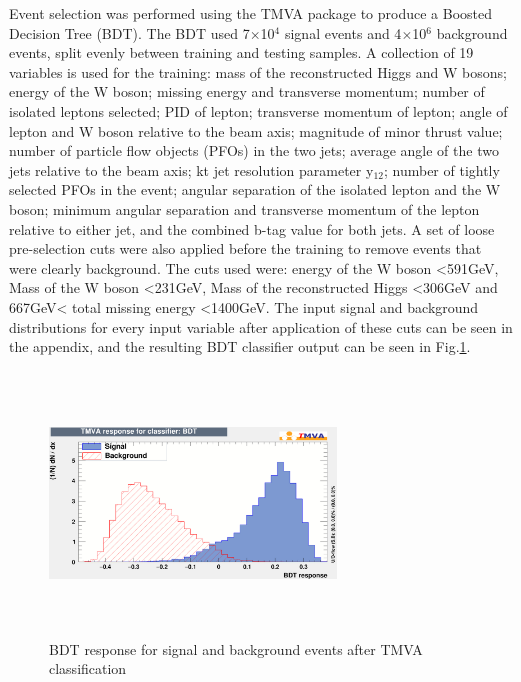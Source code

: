 Event selection was performed using the TMVA package \cite{2007physics...3039H} to produce a Boosted Decision Tree (BDT). The BDT used 7$\times$10$^4$ signal events and 4$\times$10$^6$ background events, split evenly between training and testing samples. A collection of 19 variables is used for the training: mass of the reconstructed Higgs and W bosons; energy of the W boson; missing energy and transverse momentum; number of isolated leptons selected; PID of lepton; transverse momentum of lepton; angle of lepton and W boson relative to the beam axis; magnitude of minor thrust value; number of particle flow objects (PFOs) in the two jets; average angle of the two jets relative to the beam axis; kt jet resolution parameter y$_{12}$; number of tightly selected PFOs in the event; angular separation of the isolated lepton and the W boson;  minimum angular separation and transverse momentum of the lepton relative to either jet, and the combined b-tag value for both jets. A set of loose pre-selection cuts were also applied before the training to remove events that were clearly background. The cuts used were: energy of the W boson <591GeV, Mass of the W boson <231GeV, Mass of the reconstructed Higgs <306GeV and 667GeV< total missing energy <1400GeV. The input signal and background distributions for every input variable after application of these cuts can be seen in the appendix, and the resulting BDT classifier output can be seen in Fig.\ref{bdt}.  

\begin{figure}
  \centering
  \includegraphics[width=0.68\textwidth,height=7cm,keepaspectratio]{HiggsAnalysis/figures/bdt}
  \caption[Classifier BDT response]{BDT response for signal and background events after TMVA classification}
  \label{bdt}
\end{figure}


